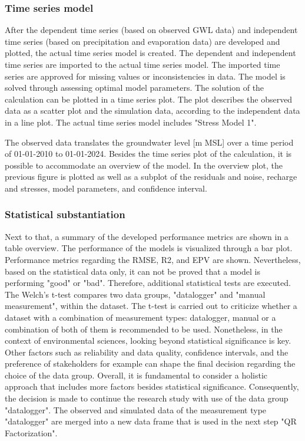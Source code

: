 \subsubsection{Time series model}
After the dependent time series (based on observed GWL data) and independent time series (based on precipitation and evaporation data) are developed and plotted, the actual time series model is created. The dependent and independent time series are imported to the actual time series model. The imported time series are approved for missing values or inconsistencies in data. The model is solved through assessing optimal model parameters. The solution of the calculation can be plotted in a time series plot. The plot describes the observed data as a scatter plot and the simulation data, according to the independent data in a line plot. The actual time series model includes "Stress Model 1".

The observed data translates the groundwater level [m MSL] over a time period of 01-01-2010 to 01-01-2024. Besides the time series plot of the calculation, it is possible to accommodate an overview of the model. In the overview plot, the previous figure is plotted as well as a subplot of the residuals and noise, recharge and stresses, model parameters, and confidence interval. 

\subsubsection{Statistical substantiation}
Next to that, a summary of the developed performance metrics are shown in a table overview. The performance of the models is visualized through a bar plot. Performance metrics regarding the RMSE, R2, and EPV are shown. Nevertheless, based on the statistical data only, it can not be proved that a model is performing "good" or "bad". Therefore, additional statistical tests are executed. The Welch's t-test compares two data groups, "datalogger" and "manual measurement", within the dataset. The t-test is carried out to criticize whether a dataset with a combination of measurement types: datalogger, manual or a combination of both of them is recommended to be used. Nonetheless, in the context of environmental sciences, looking beyond statistical significance is key. Other factors such as reliability and data quality, confidence intervals, and the preference of stakeholders for example can shape the final decision regarding the choice of the data group. Overall, it is fundamental to consider a holistic approach that includes more factors besides statistical significance. Consequently, the decision is made to continue the research study with use of the data group "datalogger". The observed and simulated data of the measurement type "datalogger" are merged into a new data frame that is used in the next step "QR Factorization". 

